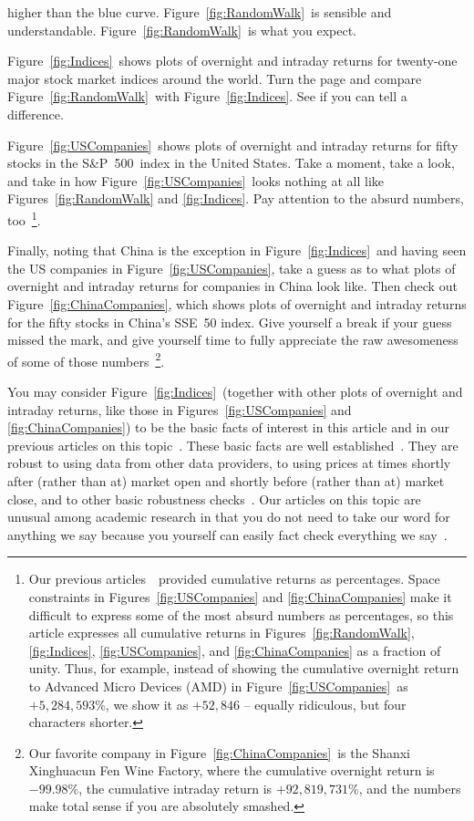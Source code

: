 \documentclass[twocolumn,twoside,prd,floatfix,letterpaper]{revtex4}
\newcommand{\ldds}[1]{#1}  %
\def \FigRandomWalk {Figure~\ref{fig:RandomWalk}}
\def \FigMain {Figure~\ref{fig:Indices}}
\def \FigIndices {Figure~\ref{fig:Indices}}
\def \FigUSCompanies {Figure~\ref{fig:USCompanies}}
\def \FigChinaCompanies {Figure~\ref{fig:ChinaCompanies}}
\def \citeKnuteson {\cite{knuteson2016,knuteson2018,knuteson2019,knuteson2020,knuteson2021}}
\def \citeAllOvernightIntradayLiterature {\cite{knuteson2016,knuteson2018,knuteson2019,knuteson2020,knuteson2021,cooper2008return,lachance2015night,qiao2020overnight,kelly2011returns,berkman2012paying,branch2012overnight,lou2019tug,bogousslavsky2021cross,lachance2020etfs}}
\def \spSOO {S\&P~500}
\begin{document}
higher than the blue curve.  \FigRandomWalk\ is sensible and understandable.  \FigRandomWalk\ is what you expect.

\FigIndices\ shows plots of overnight and intraday returns for twenty-one major stock market indices around the world.  Turn the page and compare \FigRandomWalk\ with \FigIndices.  See if you can tell a difference.

\FigUSCompanies\ shows plots of overnight and intraday returns for fifty stocks in the \spSOO\ index in the United States.  Take a moment, take a look, and take in how \FigUSCompanies\ looks nothing at all like Figures~\ref{fig:RandomWalk} and \ref{fig:Indices}.  Pay attention to the absurd numbers, too~\footnote{Our previous articles~\citeKnuteson\ provided cumulative returns as percentages.  Space constraints in Figures~\ref{fig:USCompanies} and \ref{fig:ChinaCompanies} make it difficult to express some of the most absurd numbers as percentages, so this article expresses all cumulative returns in Figures~\ref{fig:RandomWalk}, \ref{fig:Indices}, \ref{fig:USCompanies}, and \ref{fig:ChinaCompanies} as a fraction of unity.  Thus, for example, instead of showing the cumulative overnight return to Advanced Micro Devices (AMD) in \FigUSCompanies\ as \ldds{$+5{,}284{,}593\%$}, we show it as \ldds{$+52{,}846$} -- equally ridiculous, but four characters shorter.}.

Finally, noting that China is the exception in \FigIndices\ and having seen the US companies in \FigUSCompanies, take a guess as to what plots of overnight and intraday returns for companies in China look like.  Then check out \FigChinaCompanies, which shows plots of overnight and intraday returns for the fifty stocks in China's SSE~50 index.  Give yourself a break if your guess missed the mark, and give yourself time to fully appreciate the raw awesomeness of some of those numbers~\footnote{Our favorite company in \FigChinaCompanies\ is the Shanxi Xinghuacun Fen Wine Factory, where the cumulative overnight return is \ldds{$-99.98\%$}, the cumulative intraday return is \ldds{$+92{,}819{,}731\%$}, and the numbers make total sense if you are absolutely smashed.}.

You may consider \FigMain\ (together with other plots of overnight and intraday returns, like those in Figures~\ref{fig:USCompanies} and \ref{fig:ChinaCompanies}) to be the basic facts of interest in this article and in our previous articles on this topic~\citeKnuteson.  These basic facts are well established~\citeAllOvernightIntradayLiterature.  They are robust to using data from other data providers, to using prices at times shortly after (rather than at) market open and shortly before (rather than at) market close, and to other basic robustness checks~\citeAllOvernightIntradayLiterature.  Our articles on this topic are unusual among academic research in that you do not need to take our word for anything we say because you yourself can easily fact check everything we say~\cite{yahooFinance,thisArticleWebpage}.
\end{document}
